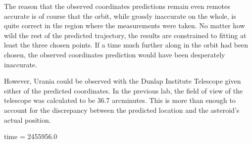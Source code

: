 \documentclass[a4paper,12pt]{article}
\begin{document}
The reason that the observed coordinates predictions remain even remotes accurate is of course that the orbit, while grossly inaccurate on the whole, is quite correct in the region where the measurements were taken. No matter how wild the rest of the predicted trajectory, the results are constrained to fitting at least the three chosen points. If a time much further along in the orbit had been chosen, the observed coordinates prediction would have been desperately inaccurate.

However, Urania could be observed with the Dunlap Institute Telescope given either of the predicted coordinates. In the previous lab, the field of view of the telescope was calculated to be 36.7 arcminutes. This is more than enough to account for the discrepancy between the predicted location and the asteroid's actual position.


time = 2455956.0




\end{document}
